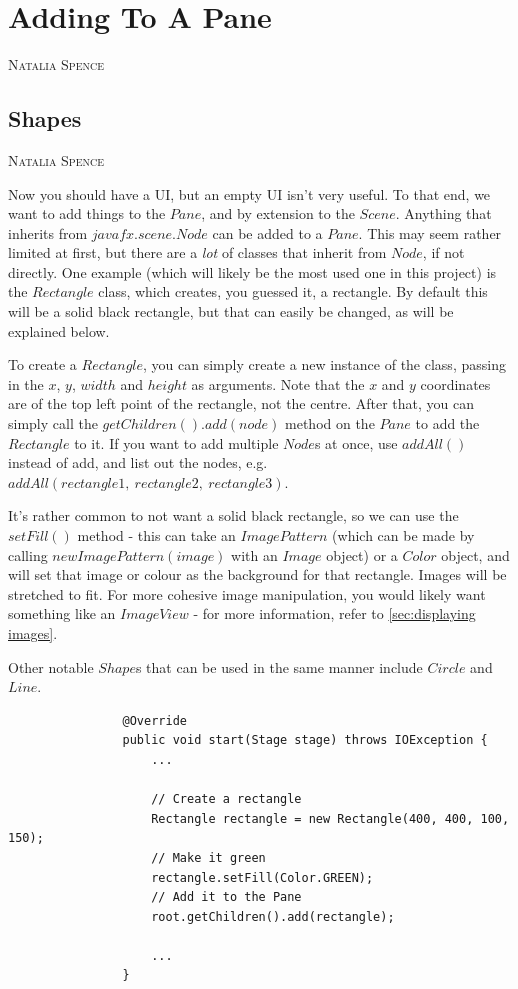 \documentclass[a4paper]{report}
\makeatletter
\newcommand{\chapterauthor}[1]{%
	{\parindent0pt\vspace*{-25pt}%
		\linespread{1.1}\large\scshape#1%
		\par\nobreak\vspace*{25pt}}
	\@afterheading%
}
\newcommand{\sectionauthor}[1]{%
	{\parindent0pt\vspace*{0pt}%
		\linespread{1.1}\large\scshape#1%
		\par\nobreak\vspace*{10pt}}
	\@afterheading%
}
\makeatother
\begin{document}
	\chapter{Adding To A Pane}\label{chap:adding to a pane}
	\chapterauthor{Natalia Spence}
	
		\section{Shapes}\label{sec:shapes}
		\sectionauthor{Natalia Spence}
		
			Now you should have a UI, but an empty UI isn't very useful. To that end, we want to add things to the $Pane$, and by extension to the $Scene$. Anything that inherits from $javafx.scene.Node$ can be added to a $Pane$. This may seem rather limited at first, but there are a \textit{lot} of classes that inherit from $Node$, if not directly. One example (which will likely be the most used one in this project) is the $Rectangle$ class, which creates, you guessed it, a rectangle. By default this will be a solid black rectangle, but that can easily be changed, as will be explained below.
			
			To create a $Rectangle$, you can simply create a new instance of the class, passing in the $x$, $y$, $width$ and $height$ as arguments. Note that the $x$ and $y$ coordinates are of the top left point of the rectangle, not the centre. After that, you can simply call the $getChildren().add(node)$ method on the $Pane$ to add the $Rectangle$ to it. If you want to add multiple $Node$s at once, use $addAll()$ instead of add, and list out the nodes, e.g. $addAll(rectangle1,\ rectangle2,\ rectangle3)$.
			
			It's rather common to not want a solid black rectangle, so we can use the $setFill()$ method - this can take an $ImagePattern$ (which can be made by calling $new ImagePattern(image)$ with an $Image$ object) or a $Color$ object, and will set that image or colour as the background for that rectangle. Images will be stretched to fit. For more cohesive image manipulation, you would likely want something like an $ImageView$ - for more information, refer to \vref{sec:displaying images}.
			
			Other notable $Shape$s that can be used in the same manner include $Circle$ and $Line$.
			
			\begin{lstlisting}
				@Override
				public void start(Stage stage) throws IOException {
					...
					
					// Create a rectangle
					Rectangle rectangle = new Rectangle(400, 400, 100, 150);
					// Make it green
					rectangle.setFill(Color.GREEN);
					// Add it to the Pane
					root.getChildren().add(rectangle);					
					
					...
				}
			\end{lstlisting}
			
\end{document}
